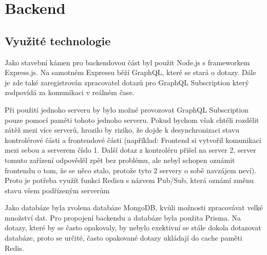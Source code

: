 \section{Backend}

\subsection{Využité technologie}
Jako stavební kámen pro backendovou část byl použit Node.js s frameworkem Express.js. Na samotném Expressu běží GraphQL, které se stará o dotazy. Dále je zde také zaregistrován zpracovatel dotazů pro GraphQL Subscription který zodpovídá za komunikaci v reálném čase.\par
Při použití jednoho serveru by bylo možné provozovat GraphQL Subscription pouze pomocí paměti tohoto jednoho serveru. Pokud bychom však chtěli rozdělit zátěž mezi více serverů, hrozilo by riziko, že dojde k desynchronizaci stavu kontrolérové části a frontendové části (například: Frontend si vytvořil komunikaci mezi sebou a serverem číslo 1. Další dotaz z kontroléru přišel na server 2, server tomuto zařízení odpověděl zpět bez problému, ale nebyl schopen oznámit frontendu o tom, že se něco stalo, protože tyto 2 servery o sobě navzájem neví). Proto je potřeba využít funkci Redisu s názvem Pub/Sub\cite{PubSub}, která oznámí změnu stavu všem podřízeným serverům\par
Jako databáze byla zvolena databáze MongoDB, kvůli možnosti zpracovávat velké množství dat. Pro propojení backendu a databáze byla použita Prisma. Na dotazy, které by se často opakovaly, by nebylo exektivní se stále dokola dotazovat databáze, proto se určité, často opakované dotazy ukládají do cache paměti Redis.\par


